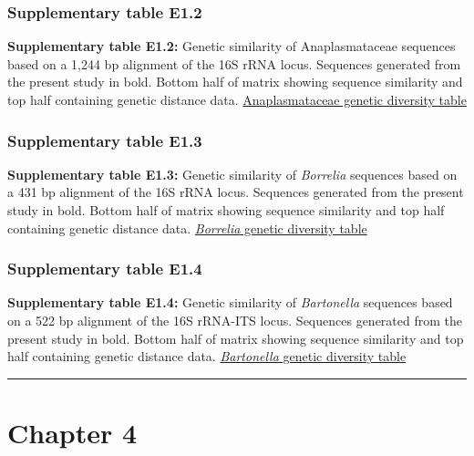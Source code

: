 \documentclass[a4paper, nobind]{templates/ociamthesis}
\begin{document}
\hypertarget{supplementary-table-e1.2}{%
\subsubsection{Supplementary table E1.2}\label{supplementary-table-e1.2}}

\textbf{Supplementary table E1.2:} Genetic similarity of Anaplasmataceae sequences based on a 1,244 bp alignment of the 16S rRNA locus. Sequences generated from the present study in bold. Bottom half of matrix showing sequence similarity and top half containing genetic distance data.
\href{https://ndownloader.figshare.com/files/27452720}{Anaplasmataceae genetic diversity table}

\hypertarget{supplementary-table-e1.3}{%
\subsubsection{Supplementary table E1.3}\label{supplementary-table-e1.3}}

\textbf{Supplementary table E1.3:} Genetic similarity of \emph{Borrelia} sequences based on a 431 bp alignment of the 16S rRNA locus. Sequences generated from the present study in bold. Bottom half of matrix showing sequence similarity and top half containing genetic distance data.
\href{https://figshare.com/ndownloader/files/35862953}{\emph{Borrelia} genetic diversity table}

\hypertarget{supplementary-table-e1.4}{%
\subsubsection{Supplementary table E1.4}\label{supplementary-table-e1.4}}

\textbf{Supplementary table E1.4:} Genetic similarity of \emph{Bartonella} sequences based on a 522 bp alignment of the 16S rRNA-ITS locus. Sequences generated from the present study in bold. Bottom half of matrix showing sequence similarity and top half containing genetic distance data.
\href{https://ndownloader.figshare.com/files/27452723}{\emph{Bartonella} genetic diversity table}

\begin{center}\rule{0.5\linewidth}{0.5pt}\end{center}

\clearpage

\hypertarget{ch4-supp}{%
\section{Chapter 4}\label{ch4-supp}}
\end{document}
